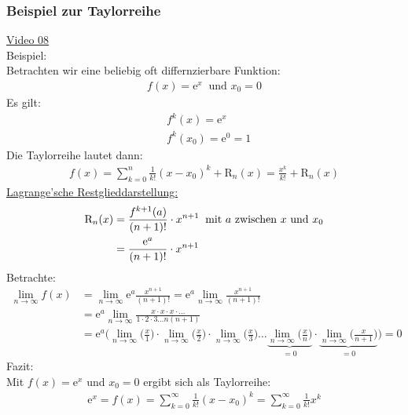 \subsubsection{Beispiel zur Taylorreihe}
\href{https://youtu.be/AJxupcdeQJc}{Video 08}\\
Beispiel:\\
Betrachten wir eine beliebig oft differnzierbare Funktion:\\
\begin{align*}
	f(x)=\mathrm{e}^x\;\;\text{und  } x_0=0
\end{align*}
Es gilt:\\
\begin{align*}
	&f^k (x)=\mathrm{e}^x\\
	&f^k (x_0)=\mathrm{e}^0=1
\end{align*}
Die Taylorreihe lautet dann:\\
\begin{align*}
	f(x)=\sum\limits_{k=0}^{n}\frac{1}{k!}(x-x_0)^k+\mathrm{R}_n(x)=\frac{x^k}{k!}+\mathrm{R}_n(x)
\end{align*}
\underline{Lagrange'sche Restglieddarstellung:}
\begin{align*}
	\mathrm{R}_n(x)&=\frac{f^{k+1}(a)}{(n+1)!}\cdot x^{n+1}\;\;\text{mit $ a $ zwischen $ x $ und $ x_0 $}\\
	&=\frac{\mathrm{e}^{a}}{(n+1)!}\cdot x^{n+1}
\end{align*}
Betrachte:\\
\begin{align*}
	\lim\limits_ {n\to\infty}f(x)&=\lim\limits_ {n\to\infty}\mathrm{e}^{a}\frac{x^{n+1}}{(n+1)!}=\mathrm{e}^{a}\lim\limits_ {n\to\infty}\frac{x^{n+1}}{(n+1)!}\\
	&=\mathrm{e}^{a}\lim\limits_ {n\to\infty}\frac{x\cdot x\cdot x\cdot\dots}{1\cdot 2 \cdot 3\dots  n (n+1)}\\
	&=\mathrm{e}^{a}\bigg(\lim\limits_ {n\to\infty}\bigg(\frac{x}{1}\bigg)\cdot \lim\limits_ {n\to\infty}\bigg(\frac{x}{2}\bigg)\cdot \lim\limits_ {n\to\infty}\bigg(\frac{x}{3}\bigg)\dots \underbrace {\lim\limits_ {n\to\infty}\bigg(\frac{x}{n}\bigg)}_{=0}\cdot \underbrace {\lim\limits_ {n\to\infty}\bigg(\frac{x}{n+1}\bigg)}_{=0}\bigg)=0
\end{align*}
Fazit:\\
Mit $ f(x)=\mathrm{e}^x $ und $ x_0=0 $ ergibt sich als Taylorreihe:\\
\begin{align*}
	\mathrm{e}^x=f(x)=\sum\limits_{k=0}^{\infty}\frac{1}{k!}(x-x_0)^k=\sum\limits_{k=0}^{\infty}\frac{1}{k!}x^k
\end{align*}
